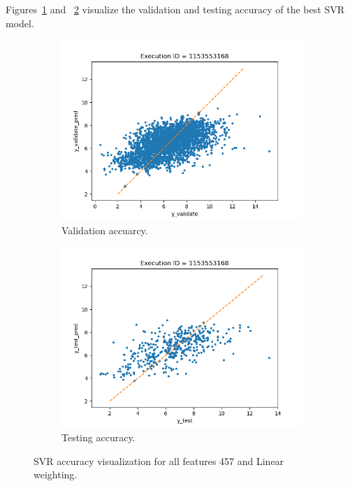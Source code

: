 \documentclass[11pt]{article}
\begin{document}
Figures~\ref{fig:SVRvalidate} and ~\ref{fig:SVRtest} visualize the validation and testing accuracy of the best SVR model.

\begin{figure}
     \centering
     \begin{subfigure}[b]{0.45\textwidth}
         \centering
         \includegraphics[scale=0.45]{images/SVRvalidate}
         \caption{Validation accuarcy.}
        \label{fig:SVRvalidate}
     \end{subfigure}
     \hfill
     \begin{subfigure}[b]{0.45\textwidth}
         \centering
         \includegraphics[scale=0.45]{images/SVRtest}
        \caption{Testing accuracy.}
        \label{fig:SVRtest}
     \end{subfigure}
     \caption{SVR accuracy visualization for all features 457 and Linear weighting.}
     \label{fig:SVRaccuracy}
\end{figure}
\end{document}
